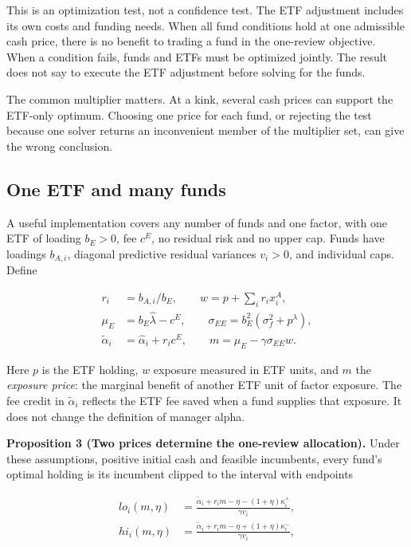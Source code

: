 \documentclass[11pt]{article}
\begin{document}
This is an optimization test, not a confidence test. The ETF adjustment includes its own costs and funding needs. When all fund conditions hold at one admissible cash price, there is no benefit to trading a fund in the one-review objective. When a condition fails, funds and ETFs must be optimized jointly. The result does not say to execute the ETF adjustment before solving for the funds.

The common multiplier matters. At a kink, several cash prices can support the ETF-only optimum. Choosing one price for each fund, or rejecting the test because one solver returns an inconvenient member of the multiplier set, can give the wrong conclusion.

\subsection{One ETF and many funds}\label{sec:3.3}

A useful implementation covers any number of funds and one factor, with one ETF of loading \(b_E>0\), fee \(c^E\), no residual risk and no upper cap. Funds have loadings \(b_{A,i}\), diagonal predictive residual variances \(v_i>0\), and individual caps. Define

\begin{equation*}
\begin{aligned}
r_i&=b_{A,i}/b_E,\qquad w=p+\sum_i r_i x_i^A,\\
\mu_E&=b_E\hat\lambda-c^E,\qquad
\sigma_{EE}=b_E^2(\sigma_f^2+p^\lambda),\\
\tilde\alpha_i&=\hat\alpha_i+r_i c^E,\qquad
m=\mu_E-\gamma\sigma_{EE}w.
\end{aligned}
\tag{13}\label{eq:13}
\end{equation*}

Here \(p\) is the ETF holding, \(w\) exposure measured in ETF units, and \(m\) the \emph{exposure price}: the marginal benefit of another ETF unit of factor exposure. The fee credit in \(\tilde\alpha_i\) reflects the ETF fee saved when a fund supplies that exposure. It does not change the definition of manager alpha.

\label{res:Proposition-3}
\textbf{Proposition 3 (Two prices determine the one-review allocation).} Under these assumptions, positive initial cash and feasible incumbents, every fund's optimal holding is its incumbent clipped to the interval with endpoints

\begin{equation*}
\begin{aligned}
lo_i(m,\eta)&=\frac{\tilde\alpha_i+r_i m-\eta-(1+\eta)\kappa_i^+}{\gamma v_i},\\
hi_i(m,\eta)&=\frac{\tilde\alpha_i+r_i m-\eta+(1+\eta)\kappa_i^-}{\gamma v_i},
\end{aligned}
\tag{14}\label{eq:14}
\end{equation*}
\end{document}
